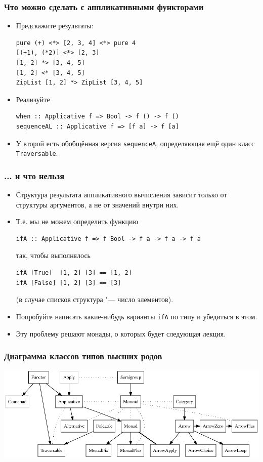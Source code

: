 \documentclass[11pt]{beamer}
\begin{document}
\begin{frame}[fragile]
\frametitle{Что можно сделать с аппликативными функторами}
\begin{itemize}
    \item Предскажите результаты:
\begin{lstlisting}[basicstyle=\ttfamily\small]
pure (+) <*> [2, 3, 4] <*> pure 4
[(+1), (*2)] <*> [2, 3]
[1, 2] *> [3, 4, 5]
[1, 2] <* [3, 4, 5]
ZipList [1, 2] *> ZipList [3, 4, 5]
\end{lstlisting}
    \pause
    \item Реализуйте
\begin{lstlisting}[basicstyle=\ttfamily\small]
when :: Applicative f => Bool -> f () -> f ()    
sequenceAL :: Applicative f => [f a] -> f [a]
\end{lstlisting}
    \item У второй есть обобщённая версия \href{http://hackage.haskell.org/package/base-4.12.0.0/docs/Data-Traversable.html#v:sequenceA}{\lstinline|sequenceA|}, определяющая ещё один класс \lstinline|Traversable|.
\end{itemize}
\end{frame}

\begin{frame}[fragile]
\frametitle{... и что нельзя}
\begin{itemize}
    \item Структура результата аппликативного вычисления зависит только от структуры аргументов, а не от значений внутри них. 
    \item Т.е. мы не можем определить функцию
\begin{lstlisting}[basicstyle=\ttfamily\small]
ifA :: Applicative f => f Bool -> f a -> f a -> f a
\end{lstlisting}
так, чтобы выполнялось
\begin{lstlisting}[basicstyle=\ttfamily\small]
ifA [True]  [1, 2] [3] == [1, 2]
ifA [False] [1, 2] [3] == [3]
\end{lstlisting}
(в случае списков структура "--- число элементов).
    \pause
    \item Попробуйте написать какие-нибудь варианты \lstinline|ifA| по типу и убедиться в этом.
    \pause
    \item Эту проблему решают монады, о которых будет следующая лекция.
\end{itemize}
\end{frame}

\begin{frame}[fragile]
\frametitle{Диаграмма классов типов высших родов}
\includegraphics[width=\linewidth]{Typeclassopedia-diagram.png}
\end{frame}
\end{document}
